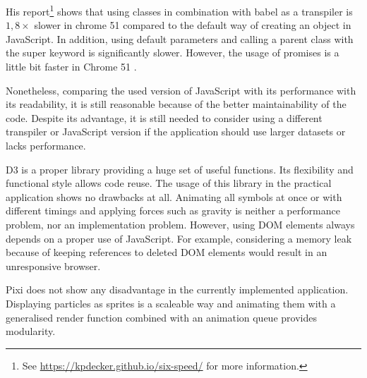 His report\footnote{See \href{https://kpdecker.github.io/six-speed/}{https://kpdecker.github.io/six-speed/} for more information.} shows that using classes in combination with babel as a transpiler is $1,8\times$ slower in chrome 51 compared to the default way of creating an object in JavaScript. In addition, using default parameters and calling a parent class with the super keyword is significantly slower. However, the usage of promises is a little bit faster in Chrome 51 .

Nonetheless, comparing the used version of JavaScript with its performance with its readability, it is still reasonable because of the better maintainability of the code. Despite its advantage, it is still needed to consider using a different transpiler or JavaScript version if the application should use larger datasets or lacks performance.

\ac{D3} is a proper library providing a huge set of useful functions. Its flexibility and functional style allows code reuse. The usage of this library in the practical application shows no drawbacks at all. Animating all symbols at once or with different timings and applying forces such as gravity is neither a performance problem, nor an implementation problem. However, using \ac{DOM} elements always depends on a proper use of JavaScript. For example, considering a memory leak because of keeping references to deleted \ac{DOM} elements would result in an unresponsive browser.

\ac{Pixi} does not show any disadvantage in the currently implemented application. Displaying particles as sprites is a scaleable way and animating them with a generalised render function combined with an animation queue provides modularity.